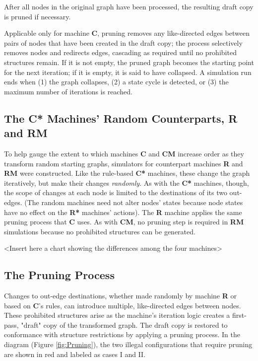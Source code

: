 \documentclass{tufte-handout}
\begin{document}
After all nodes in the original graph have been processed,
the resulting draft copy is pruned if necessary.

Applicable only for machine \textbf{C}, pruning removes
any like-directed edges between pairs of nodes that have been created in the
draft copy; the process selectively removes nodes
and redirects edges, cascading as required until no prohibited structures remain.
If it is not empty, the pruned graph becomes the starting point for the next iteration;
if it is empty, it is said to have collapsed.
A simulation run ends when (1) the graph collapses, (2) a state cycle is detected,
or (3) the maximum number of iterations is reached.

\subsection{The \textbf{C*} Machines' Random Counterparts, \textbf{R} and \textbf{RM}}

To help gauge the extent to which machines \textbf{C} and \textbf{CM}
increase order as they transform random starting graphs, simulators for counterpart
machines \textbf{R} and \textbf{RM} were constructed. Like the rule-based \textbf{C*} machines,
these change the graph iteratively, but make their changes \textit{randomly}.
As with the \textbf{C*} machines, though, the scope of changes at each node is
limited to the destinations of its two out-edges. (The random machines need not alter nodes' states
because node states have no effect on the \textbf{R*} machines' actions).
The \textbf{R} machine applies the same pruning process that \textbf{C} uses. As
with \textbf{CM}, no pruning step is required in \textbf{RM} simulations because
no prohibited structures can be generated.

<Insert here a chart showing the differences among the four machines>

\subsection{The Pruning Process}

Changes to out-edge destinations, whether made randomly by machine \textbf{R} or based on \textbf{C}'s
rules, can introduce multiple, like-directed edges between nodes. These prohibited structures
arise as the machine's iteration logic creates a first-pass, "draft" copy of the transformed graph.
The draft copy is restored to conformance with structure restrictions by applying a
pruning process. In the diagram (Figure \ref{fig:Pruning}),
the two illegal configurations that require pruning are shown in red and
labeled as cases I and II.
\end{document}
